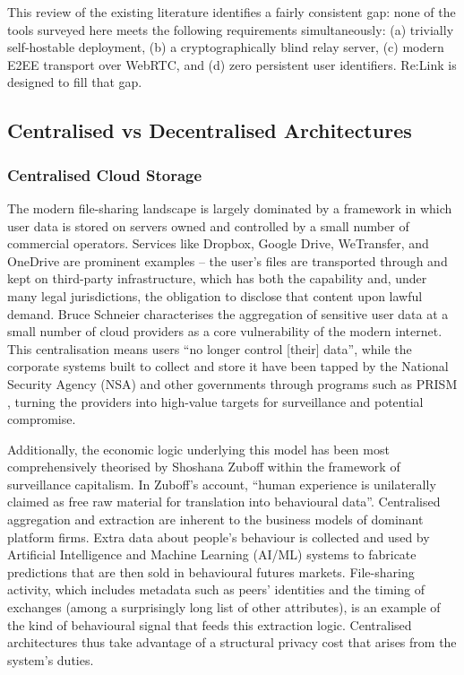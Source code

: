 \documentclass[12pt,a4paper]{article}
\begin{document}
This review of the existing literature identifies a fairly consistent gap: none of the tools surveyed here meets the following requirements simultaneously: (a) trivially self-hostable deployment, (b) a cryptographically blind relay server, (c) modern E2EE transport over WebRTC, and (d) zero persistent user identifiers. Re:Link is designed to fill that gap.

\subsection{Centralised vs Decentralised Architectures}

\subsubsection{Centralised Cloud Storage}

The modern file-sharing landscape is largely dominated by a framework in which user data is stored on servers owned and controlled by a small number of commercial operators. Services like Dropbox, Google Drive, WeTransfer, and OneDrive are prominent examples – the user’s files are transported through and kept on third-party infrastructure, which has both the capability and, under many legal jurisdictions, the obligation to disclose that content upon lawful demand. Bruce Schneier \cite{schneier2015} characterises the aggregation of sensitive user data at a small number of cloud providers as a core vulnerability of the modern internet. This centralisation means users “no longer control [their] data”, while the corporate systems built to collect and store it have been tapped by the National Security Agency (NSA) and other governments through programs such as PRISM \cite{epicprism}, turning the providers into high-value targets for surveillance and potential compromise.

Additionally, the economic logic underlying this model has been most comprehensively theorised by Shoshana Zuboff \cite{zuboff2019} within the framework of surveillance capitalism. In Zuboff’s account, “human experience is unilaterally claimed as free raw material for translation into behavioural data”. Centralised aggregation and extraction are inherent to the business models of dominant platform firms. Extra data about people’s behaviour is collected and used by Artificial Intelligence and Machine Learning (AI/ML) systems to fabricate predictions that are then sold in behavioural futures markets. File-sharing activity, which includes metadata such as peers’ identities and the timing of exchanges (among a surprisingly long list of other attributes), is an example of the kind of behavioural signal that feeds this extraction logic. Centralised architectures thus take advantage of a structural privacy cost that arises from the system’s duties.
\end{document}
